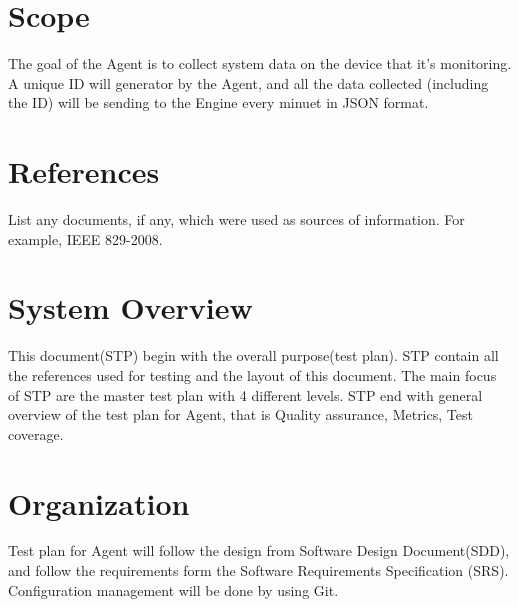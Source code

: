 \documentclass[letterpaper,12pt,oneside,listof=totoc]{scrreprt}
\begin{document}
\section{Scope}


The goal of the Agent is to collect system data on the device that it's monitoring. A unique ID will generator by the Agent, and all the data collected (including the ID) will be sending to the Engine every minuet in JSON format. 


\section{References}

List any documents, if any, which were used as sources of information. For example, IEEE 829-2008.




\section{System Overview}

This document(STP) begin with the overall purpose(test plan). STP contain all the references used for testing and the layout of this document. The main focus of STP are the master test plan with 4 different levels. STP end with general overview of the test plan for Agent, that is Quality assurance, Metrics, Test coverage. 


\section{Organization}


Test plan for Agent will follow the design from Software Design Document(SDD), and follow the requirements form the Software Requirements Specification (SRS). Configuration management will be done by using Git. 
\end{document}
